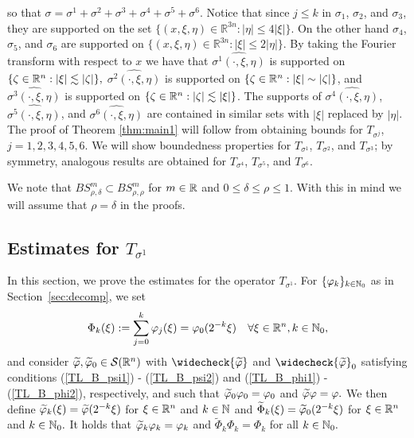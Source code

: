 so that $\sigma = \sigma^1+\sigma^2+\sigma^3+\sigma^4+\sigma^5+\sigma^6.$ Notice that since $j\leq k$ in $\sigma_1$, $\sigma_2$, and $\sigma_3$, they are supported on the set $\{(x,\xi,\eta) \in \mathbb{R}^{3n} : |\eta| \leq 4|\xi|\}$. On the other hand $\sigma_4$, $\sigma_5$, and $\sigma_6$ are supported on $\{(x,\xi,\eta) \in \mathbb{R}^{3n} : |\xi| \leq 2|\eta|\}$. By taking the Fourier transform with respect to $x$ we have that $\widehat{\sigma^1(\cdot,\xi,\eta)}$ is supported on $\{\zeta\in{{\mathbb R}^n}: \left\vert \xi \right\vert\lesssim \left\vert \zeta \right\vert\},$
$\widehat{\sigma^2(\cdot,\xi,\eta)}$ is supported on $\{\zeta\in{{\mathbb R}^n}: \left\vert \xi \right\vert\sim \left\vert \zeta \right\vert\}$, and $\widehat{\sigma^3(\cdot,\xi,\eta)}$ is supported on $\{\zeta\in{{\mathbb R}^n}: \left\vert \zeta \right\vert\lesssim \left\vert \xi \right\vert\}$. The supports of $\widehat{\sigma^4(\cdot,\xi,\eta)}$, $\widehat{\sigma^5(\cdot,\xi,\eta)}$, and $\widehat{\sigma^6(\cdot,\xi,\eta)}$ are contained in similar sets with $|\xi|$ replaced by $|\eta|$. The proof of Theorem \ref{thm:main1} will follow from obtaining bounds for $T_{\sigma^j}$, $j=1,2,3,4,5,6$. We will show boundedness properties for $T_{\sigma^1}$, $T_{\sigma^2}$, and $T_{\sigma^3}$; by symmetry, analogous results are obtained for $T_{\sigma^4}$, $T_{\sigma^5}$, and $T_{\sigma^6}$.

We note that $BS^m_{\rho,\delta}\subset BS^m_{\rho,\rho}$ for $m\in\mathbb{R}$ and $0\le \delta\le \rho\le 1$. With this in mind we will assume that $\rho = \delta$ in the proofs.

\subsection{Estimates for $T_{\sigma^1}$}\label{sec:T1}
In this section, we prove the estimates for the operator $T_{{\sigma}^1}$. For $\{\varphi_k\}_{k\in\mathbb{N}_0}$ as in Section~\ref{sec:decomp}, we set
\begin{equation*}
\Phi_k(\xi):= \sum_{j=0}^k \varphi_j(\xi)=\varphi_0(2^{-k}\xi)\quad \forall \xi\in{{\mathbb R}^n}, k\in\mathbb{N}_0,
\end{equation*}
and consider $\widetilde{\varphi},\widetilde{\varphi}_0\in{\mathcal{S}}({{\mathbb R}^n})$ with $\widecheck{\widetilde{\f}}$ and $\widecheck{\widetilde{\f}}_0$ satisfying conditions (\ref{TL_B_psi1}) - (\ref{TL_B_psi2}) and (\ref{TL_B_phi1})  - (\ref{TL_B_phi2}), respectively, and such that $\widetilde{\varphi}_0\varphi_0=\varphi_0$ and $\widetilde{\varphi}\varphi=\varphi.$ We then define $\widetilde{\varphi}_k(\xi)=\widetilde{\varphi}(2^{-k}\xi)$ for $\xi\in{{\mathbb R}^n}$ and $k\in\mathbb{N}$ and $\widetilde{\Phi}_k(\xi)=\widetilde{\varphi}_0(2^{-k}\xi)$ for $\xi\in{{\mathbb R}^n}$ and $k\in\mathbb{N}_0.$ It holds that $\widetilde{\varphi}_k \varphi_k = \varphi_k$ and $\widetilde{\Phi}_k \Phi_k = \Phi_k$ for all $k\in\mathbb{N}_0.$

